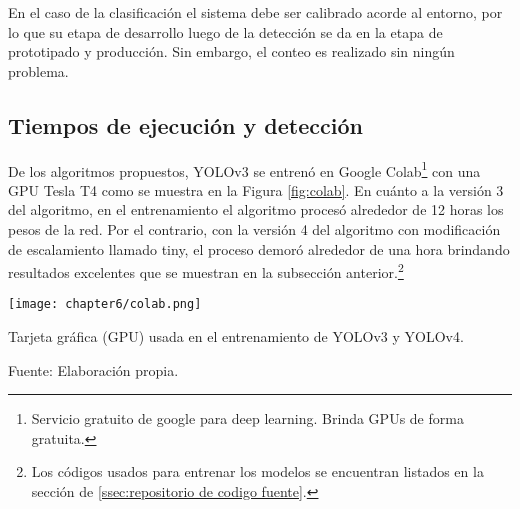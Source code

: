 En el caso de la clasificación el sistema debe ser calibrado acorde al entorno, por lo que su etapa de desarrollo luego de la detección se da en la etapa de prototipado y producción. Sin embargo, el conteo es realizado sin ningún problema.


\subsection{Tiempos de ejecución y detección}

De los algoritmos propuestos, YOLOv3 se entrenó en Google Colab\footnote{Servicio gratuito de google para deep learning. Brinda GPUs de forma gratuita.} con una GPU Tesla T4 como se muestra en la Figura \ref{fig:colab}. En cuánto a la versión 3 del algoritmo, en el entrenamiento el algoritmo procesó alrededor de 12 horas los pesos de la red. Por el contrario, con la versión 4 del algoritmo con modificación de escalamiento llamado tiny, el proceso demoró alrededor de una hora brindando resultados excelentes que se muestran en la subsección anterior.\footnote{Los códigos usados para entrenar los modelos se encuentran listados en la sección de \ref{ssec:repositorio de codigo fuente}.}

\begin{myfigure}[H]
	\footnotesize\centering
	\texttt{[image: chapter6/colab.png]}
	\caption{Tarjeta gráfica (GPU) usada en el entrenamiento de YOLOv3 y YOLOv4.}
	\begin{myflushcenter}
		Fuente: Elaboración propia.
	\end{myflushcenter}
	\label{fig:colab}
\end{myfigure}




